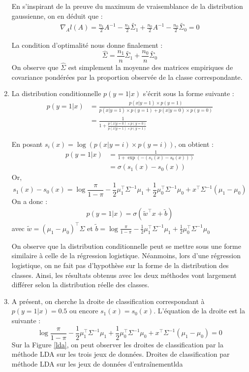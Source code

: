 \documentclass{article}
\begin{document}
\begin{enumerate}[label=(\alph*)]
En s'inspirant de la preuve du maximum de vraisemblance de la distribution gaussienne, on en déduit que :
\begin{align*}
\nabla_A l(A) = \frac{n_1}{2}A^{-1} - \frac{n_1}{2}\tilde{\Sigma_1} + \frac{n_0}{2}A^{-1} - \frac{n_0}{2}\tilde{\Sigma_0} = 0
\end{align*}

La condition d'optimalité nous donne finalement :
$$ \hat{\Sigma} = \frac{n_1}{n}\tilde{\Sigma_1} + \frac{n_0}{n}\tilde{\Sigma_0} $$
On observe que $\hat{\Sigma}$ est simplement la moyenne des matrices empiriques de covariance pondérées par la proportion observée de la classe correspondante.

\item La distribution conditionnelle $p(y=1|x)$ s'écrit sous la forme suivante :
\begin{align*}
p(y=1|x) &= \frac{p(x|y=1)\times p(y=1)}{p(x|y=1)\times p(y=1) + p(x|y=0)\times p(y=0)}\\
&= \frac{1}{1 + \frac{p(x|y=0)\times p(y=0)}{p(x|y=1)\times p(y=1)}}
\end{align*}

En posant $s_i(x) = \log(p(x|y=i)\times p(y=i))$, on obtient :
\begin{align*}
p(y=1|x) &= \frac{1}{1 + \exp(-(s_1(x)-s_0(x)))}\\
&= \sigma(s_1(x)-s_0(x))
\end{align*}
Or,
$$
s_1(x) - s_0(x) = \log\frac{\pi}{1-\pi} - \frac{1}{2}\mu_1^\intercal \Sigma^{-1} \mu_1 + \frac{1}{2}\mu_0^\intercal \Sigma^{-1}\mu_0 + x^\intercal \Sigma^{-1}(\mu_1 - \mu_0)
$$
On a donc :
\begin{align*}
p(y=1|x)=\sigma(\tilde{w}^\intercal x + \tilde{b})
\end{align*}
avec $\tilde{w} = (\mu_1-\mu_0)^\intercal \Sigma$ et $\tilde{b} = \log\frac{\pi}{1-\pi} - \frac{1}{2}\mu_1^\intercal \Sigma^{-1} \mu_1 + \frac{1}{2}\mu_0^\intercal \Sigma^{-1}\mu_0$

On observe que la distribution conditionnelle peut se mettre sous une forme similaire à celle de la régression logistique. Néanmoins, lors d'une régression logistique, on ne fait pas d'hypothèse sur la forme de la distribution des classes. Ainsi, les résultats obtenus avec les deux méthodes vont largement différer selon la distribution réelle des classes.

\item A présent, on cherche la droite de classification correspondant à $p(y=1|x) = 0.5$ ou encore $s_1(x) = s_0(x)$. L'équation de la droite est la suivante :
$$
\log\frac{\pi}{1-\pi} - \frac{1}{2}\mu_1^\intercal \Sigma^{-1} \mu_1 + \frac{1}{2}\mu_0^\intercal \Sigma^{-1}\mu_0 + x^\intercal \Sigma^{-1}(\mu_1 - \mu_0) = 0
$$
Sur la Figure \ref{lda}, on peut observer les droites de classification par la méthode LDA sur les trois jeux de données.
          {}
          {}
          {Droites de classification par méthode LDA sur les jeux de données d'entraînement}{lda}
\end{enumerate}
\end{document}
